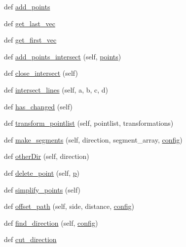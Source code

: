 \begin{DoxyCompactItemize}
\item 
def \hyperlink{classpath_1_1_path_a4fdf46b330645eac861257b1970a07af}{add\+\_\+points}
\item 
def \hyperlink{classpath_1_1_path_ace3137c91261b5018a9425084221108c}{get\+\_\+last\+\_\+vec}
\item 
def \hyperlink{classpath_1_1_path_a52f1714160d03df04339f9a463937215}{get\+\_\+first\+\_\+vec}
\item 
def \hyperlink{classpath_1_1_path_a6ae95ee07ed109482be34ff886290384}{add\+\_\+points\+\_\+intersect} (self, \hyperlink{classpath_1_1_path_a5723ebb394e0c22b8426ca7a31c7f345}{points})
\item 
def \hyperlink{classpath_1_1_path_a857ff09790f690a955d1514d71e3d6df}{close\+\_\+intersect} (self)
\item 
def \hyperlink{classpath_1_1_path_a9be74a59165e2602f0a123ef5002cae3}{intersect\+\_\+lines} (self, a, b, c, d)
\item 
def \hyperlink{classpath_1_1_path_ad750fe3a73f693587414e6f2a13c7e58}{has\+\_\+changed} (self)
\item 
def \hyperlink{classpath_1_1_path_a8a0b4d6f4e9c46f09e99c3155c70e79b}{transform\+\_\+pointlist} (self, pointlist, transformations)
\item 
def \hyperlink{classpath_1_1_path_a98309c4cbc3cd4268e1fbdc8dbdef2b0}{make\+\_\+segments} (self, direction, segment\+\_\+array, \hyperlink{classpath_1_1_path_a889e352f02dba833077975ce855276ed}{config})
\item 
def \hyperlink{classpath_1_1_path_ac464566f5ba70d4f927962eb309bf02a}{other\+Dir} (self, direction)
\item 
def \hyperlink{classpath_1_1_path_a49af3a1258dbfdec2bb9b01ff37a5fd2}{delete\+\_\+point} (self, \hyperlink{classpath_1_1_path_a4ca57bb02bfd7328aa373670e42cc7c2}{p})
\item 
def \hyperlink{classpath_1_1_path_a93fd34e5c9a41701845c09aa9aaee4e0}{simplify\+\_\+points} (self)
\item 
def \hyperlink{classpath_1_1_path_adf67e9d04d691ed77d494ccdf8ee70cd}{offset\+\_\+path} (self, side, distance, \hyperlink{classpath_1_1_path_a889e352f02dba833077975ce855276ed}{config})
\item 
def \hyperlink{classpath_1_1_path_af6c4dbb4d6d4014fe65a4fcf920f7c9a}{find\+\_\+direction} (self, \hyperlink{classpath_1_1_path_a889e352f02dba833077975ce855276ed}{config})
\item 
def \hyperlink{classpath_1_1_path_a5a198d7743b685530180b6f1cb2a21b6}{cut\+\_\+direction}
\item 

\end{DoxyCompactItemize}
